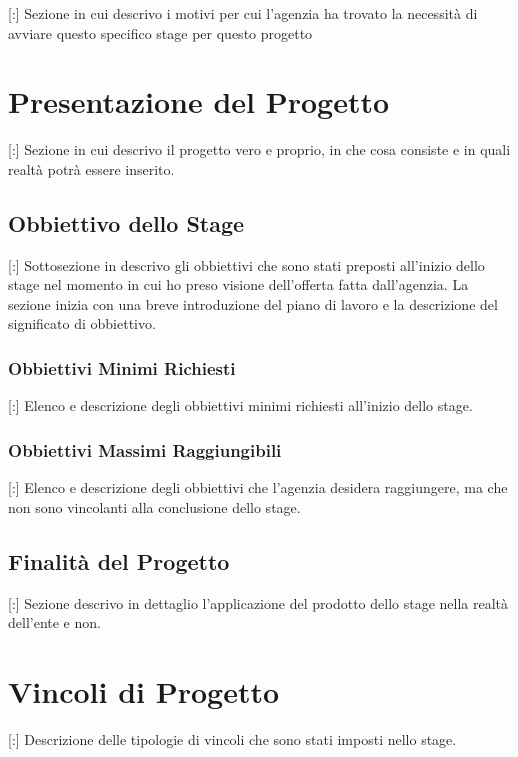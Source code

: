 [:] Sezione in cui descrivo i motivi per cui l'agenzia ha trovato la necessità di avviare questo specifico stage per questo progetto

\section{Presentazione del Progetto}

[:] Sezione in cui descrivo il progetto vero e proprio, in che cosa consiste e in quali realtà potrà essere inserito.

\subsection{Obbiettivo dello Stage}

[:] Sottosezione in descrivo gli obbiettivi che sono stati preposti all'inizio dello stage nel momento in cui ho preso visione dell'offerta fatta dall'agenzia.
La sezione inizia con una breve introduzione del piano di lavoro e la descrizione del significato di obbiettivo.

\subsubsection{Obbiettivi Minimi Richiesti}

[:] Elenco e descrizione degli obbiettivi minimi richiesti all'inizio dello stage.

\subsubsection{Obbiettivi Massimi Raggiungibili}

[:] Elenco e descrizione degli obbiettivi che l'agenzia desidera raggiungere, ma che non sono vincolanti alla conclusione dello stage.

\subsection{Finalità del Progetto}

[:] Sezione descrivo in dettaglio l'applicazione del prodotto dello stage nella realtà dell'ente e non.

\section{Vincoli di Progetto}

[:] Descrizione delle tipologie di vincoli che sono stati imposti nello stage.

